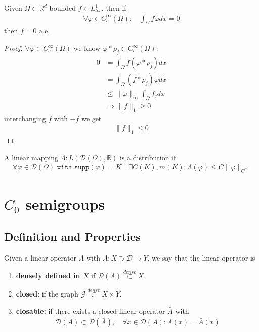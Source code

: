 \begin{theorem}
	Given $\Omega \subset \mathbb{R}^d$  bounded $f \in L^1_{loc}$, then if 
	\begin{align*}
		\forall \varphi \in C_c^\infty(\Omega): \quad 
		\int_\Omega f \varphi dx = 0
	\end{align*}
	then $f = 0$ a.e. 
\end{theorem}
\begin{proof}
	$\forall \varphi \in C_c^\infty(\Omega)$ we know $\varphi * \rho_j \in C_c^\infty(\Omega)$:
	\begin{align*}
		 0 &= \int_\Omega f (\varphi *\rho_j) dx \\
		 &= \int_\Omega (f * \rho_j) \varphi dx \\
		 &\le \|\varphi\|_\infty \int_\Omega f_j dx \\
		 &\Rightarrow 
		 \|f\|_1 \geq 0
	\end{align*}
	interchanging $f$ with $-f$ we get
	\begin{align*}
		\|f\|_1 \le 0
	\end{align*}
\end{proof}

\begin{definition}[distribution]
	A linear mapping $\Lambda: L( \mathcal{D}(\Omega), \mathbb{R})$ is a distribution if
	\begin{align*}
		\forall \varphi \in \mathcal{D}(\Omega) \texttt{ with } \texttt{supp}(\varphi) = K \quad \exists C(K), m(K):  \Lambda(\varphi) \le C\|\varphi\|_{C^m} 
	\end{align*}
\end{definition}



\section{\texorpdfstring{$C_0$}{C\_0} semigroups}
\subsection{Definition and Properties}
\begin{definition}
	Given a linear operator $A$ with $A: X \supset \mathcal{D} \rightarrow Y$, we say that the linear operator is 
	\begin{enumerate}
		\item \textbf{densely defined in $X$} if $\mathcal{D}(A) \overset{dense}{\subset} X$.
		\item \textbf{closed}: if the graph $\mathcal{G} \overset{dense}{\subset} X \times Y$. 
		\item \textbf{closable:} if there exists a closed linear operator $\bar{A}$ with 
		\begin{align*}
			\mathcal{D}(A) \subset \mathcal{D}(\bar{A}), \quad \forall x \in \mathcal{D}(A): A(x) = \bar{A}(x)
		\end{align*}
	\end{enumerate}
\end{definition}

